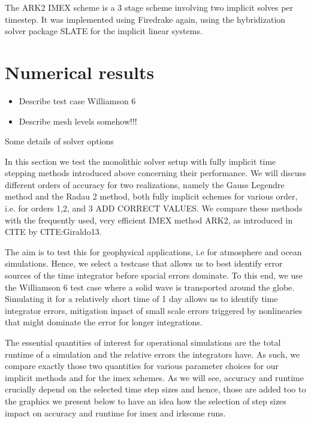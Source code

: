 \documentclass[a4paper, 12pt]{article}
\newcommand{\checkit}[1]{{\color{red}#1}}
\begin{document}
The ARK2 IMEX scheme is a 3 stage scheme involving two implicit solves
per timestep. It was implemented using Firedrake again, using the
hybridization solver package SLATE \citep{gibson2020slate} for the
implicit linear systems.

\section{Numerical results}


\begin{itemize}
 \item Describe test case Williamson 6
 \item Describe mesh levels somehow!!!
\end{itemize}

Some details of solver options

In this section we test the monolithic solver setup with fully implicit time stepping methods introduced above concerning their performance. We will discuss different orders of accuracy for two realizations, namely the Gauss Legendre method and the Radau 2 method, both fully implicit schemes for various order, i.e. for orders 1,2, and 3 \checkit{ADD CORRECT VALUES.} We compare these methods with the frequently used, very efficient IMEX method ARK2, as introduced in CITE by CITE:Giraldo13.

The aim is to test this for geophysical applications, i.e for atmosphere and ocean simulations. Hence, we select a testcase that allows us to best identify error sources of the time integrator before spacial errors dominate. To this end, we use the Williamson 6 test case where a solid wave is transported around the globe. Simulating it for a relatively short time of 1 day allows us to identify time integrator errors, mitigation inpact of small scale errors triggered by nonlinearies that might dominate the error for longer integrations.

The essential quantities of interest for operational simulations are the total runtime of a simulation and the relative errors the integrators have. As such, we compare exactly those two quantities for various parameter choices for our implicit methods and for the imex schemes. As we will see, accuracy and runtime crucially depend on the selected time step sizes and hence, those are added too to the graphics we present below to have an idea how the selection of step sizes impact on accuracy and runtime for imex and irksome runs.
\end{document}
